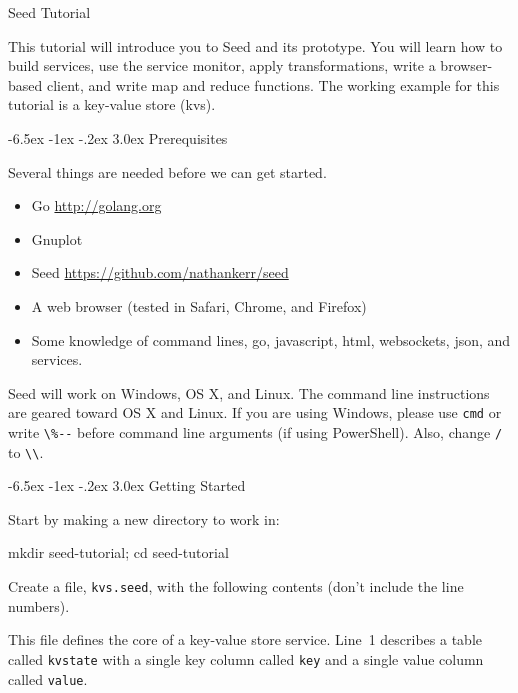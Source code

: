 \documentclass[a5paper,12pt,onecolumn]{article}
\makeatletter
\def\code#1{\mbox{\lstinline{#1}}}
\renewcommand\section{\@startsection {section}{1}{\z@}%
	{-6.5ex \@plus -1ex \@minus -.2ex}%
	{3.0ex}%
	{\sf\Large}}
\makeatother
\begin{document}
\begin{center}
	\sf\Huge Seed Tutorial
\end{center}

This tutorial will introduce you to Seed and its prototype. You will learn how to build services, use the service monitor, apply transformations, write a browser-based client, and write map and reduce functions. The working example for this tutorial is a key-value store (kvs).

\section{Prerequisites}

Several things are needed before we can get started.

\begin{itemize}
\item Go \url{http://golang.org}
\item Gnuplot
\item Seed \url{https://github.com/nathankerr/seed}
\item A web browser (tested in Safari, Chrome, and Firefox)
\item Some knowledge of command lines, go, javascript, html, websockets, json, and services.
\end{itemize}

Seed will work on Windows, OS X, and Linux. The command line instructions are geared toward OS X and Linux. If you are using Windows, please use \code{cmd} or write \code{\%--} before command line arguments (if using PowerShell). Also, change \code{/} to \code{\\}.

\section{Getting Started}

Start by making a new directory to work in:

\begin{cli}
mkdir seed-tutorial; cd seed-tutorial
\end{cli}

Create a file, \code{kvs.seed}, with the following contents (don't include the line numbers).



This file defines the core of a key-value store service. Line~1 describes a table called \code{kvstate} with a single key column called \code{key} and a single value column called \code{value}.
\end{document}
